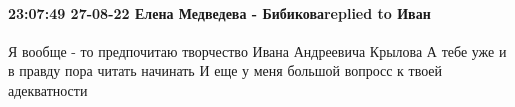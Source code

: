  
 
 
 
 

\paragraph{23:07:49 27-08-22 Елена Медведева - Бибиковаreplied to Иван}

Я вообще - то предпочитаю творчество Ивана Андреевича Крылова А тебе уже и в
правду пора читать начинать И еще у меня большой вопросс к твоей адекватности
